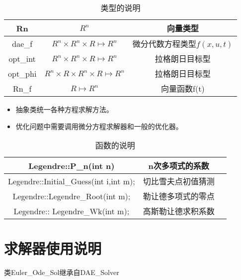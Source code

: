 \documentclass[a4]{ctexart}
\begin{document}
\begin{table}[h]
\centering  %
\caption{类型的说明}  %
\label{table1}  %
\begin{tabular}{|c|c|c|} 
\hline
Rn     &    $R^n$     &           向量类型  \\
\hline
dae\_f &   $R^n\times R^n\times R \mapsto R^n$ & 微分代数方程类型$f(x,u,t)$\\
 \hline
  opt\_int & $R^n\times R^n\times R\mapsto R^n$  & 拉格朗日目标型\\
 \hline
 opt\_phi   & $ R^n\times R\times R^n\times R\mapsto R^n$  & 拉格朗日目标型\\
 \hline
 Rn\_f   & $ R\mapsto R^n$  & 向量函数f(t)\\
 \hline
 
\end{tabular}
\end{table}



\begin{itemize}
\item 抽象类统一各种方程求解方法。
\item 优化问题中需要调用微分方程求解器和一般的优化器。
\end{itemize}






\begin{table}[h]
\centering  %
\caption{函数的说明}  %
\label{table1}  %
\begin{tabular}{|c|c|c|} 
\hline
Legendre::P\_n(int n)  &    n次多项式的系数     &              \\
\hline
Legendre::Initial\_Guess(int i,int m); &   切比雪夫点初值猜测&  \\
 \hline
Legendre::Legendre\_Root(int m); & 勒让德多项式的零点 &  \\
 \hline
Legendre:: Legendre\_Wk(int m);   & 高斯勒让德求积系数 &  \\
 \hline
 
\end{tabular}
\end{table}


 


\section{求解器使用说明}
类Euler\_Ode\_Sol继承自DAE\_Solver
\end{document}
